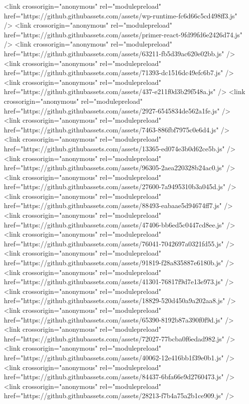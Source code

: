   <link crossorigin="anonymous" rel="modulepreload" href="https://github.githubassets.com/assets/wp-runtime-fc6d66c5cd498ff3.js" />
<link crossorigin="anonymous" rel="modulepreload" href="https://github.githubassets.com/assets/primer-react-9fd99fd6e2426d74.js" />
<link crossorigin="anonymous" rel="modulepreload" href="https://github.githubassets.com/assets/63211-fb5d39ac620e02bb.js" />
<link crossorigin="anonymous" rel="modulepreload" href="https://github.githubassets.com/assets/71393-dc1516dc49efc6b7.js" />
<link crossorigin="anonymous" rel="modulepreload" href="https://github.githubassets.com/assets/437-e211f0d3b29f548a.js" />
<link crossorigin="anonymous" rel="modulepreload" href="https://github.githubassets.com/assets/2927-6545834de562a1fe.js" />
<link crossorigin="anonymous" rel="modulepreload" href="https://github.githubassets.com/assets/7463-886fbf7975c0e6d4.js" />
<link crossorigin="anonymous" rel="modulepreload" href="https://github.githubassets.com/assets/13365-ed074e3b0d62ce5b.js" />
<link crossorigin="anonymous" rel="modulepreload" href="https://github.githubassets.com/assets/96305-2aea220328b24ac0.js" />
<link crossorigin="anonymous" rel="modulepreload" href="https://github.githubassets.com/assets/27600-7a9495310b3a045d.js" />
<link crossorigin="anonymous" rel="modulepreload" href="https://github.githubassets.com/assets/88493-eabaae5d94674ff7.js" />
<link crossorigin="anonymous" rel="modulepreload" href="https://github.githubassets.com/assets/47406-bb6ed5c0447cd8ee.js" />
<link crossorigin="anonymous" rel="modulepreload" href="https://github.githubassets.com/assets/76041-7042697a0321fd55.js" />
<link crossorigin="anonymous" rel="modulepreload" href="https://github.githubassets.com/assets/91819-f28a835887e6180b.js" />
<link crossorigin="anonymous" rel="modulepreload" href="https://github.githubassets.com/assets/41301-76817f9d7e13e973.js" />
<link crossorigin="anonymous" rel="modulepreload" href="https://github.githubassets.com/assets/18829-520d450a9a202aa8.js" />
<link crossorigin="anonymous" rel="modulepreload" href="https://github.githubassets.com/assets/65390-8192b87a390f0f9d.js" />
<link crossorigin="anonymous" rel="modulepreload" href="https://github.githubassets.com/assets/72027-77bcba0f6edad982.js" />
<link crossorigin="anonymous" rel="modulepreload" href="https://github.githubassets.com/assets/40062-12e416bb1f39e0b1.js" />
<link crossorigin="anonymous" rel="modulepreload" href="https://github.githubassets.com/assets/84437-6bfa66e9d2760473.js" />
<link crossorigin="anonymous" rel="modulepreload" href="https://github.githubassets.com/assets/28213-f7b4a75a2b1ce909.js" />
